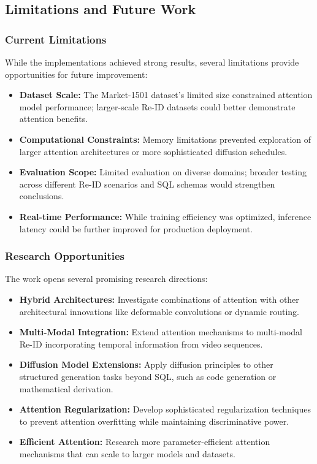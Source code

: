 \documentclass[a4paper,12pt]{article}
\begin{document}
\subsection{Limitations and Future Work}

\subsubsection*{Current Limitations}
While the implementations achieved strong results, several limitations provide opportunities for future improvement:

\begin{itemize}
    \item \textbf{Dataset Scale:} The Market-1501 dataset's limited size constrained attention model performance; larger-scale Re-ID datasets could better demonstrate attention benefits.
    \item \textbf{Computational Constraints:} Memory limitations prevented exploration of larger attention architectures or more sophisticated diffusion schedules.
    \item \textbf{Evaluation Scope:} Limited evaluation on diverse domains; broader testing across different Re-ID scenarios and SQL schemas would strengthen conclusions.
    \item \textbf{Real-time Performance:} While training efficiency was optimized, inference latency could be further improved for production deployment.
\end{itemize}

\subsubsection*{Research Opportunities}
The work opens several promising research directions:

\begin{itemize}
    \item \textbf{Hybrid Architectures:} Investigate combinations of attention with other architectural innovations like deformable convolutions or dynamic routing.
    \item \textbf{Multi-Modal Integration:} Extend attention mechanisms to multi-modal Re-ID incorporating temporal information from video sequences.
    \item \textbf{Diffusion Model Extensions:} Apply diffusion principles to other structured generation tasks beyond SQL, such as code generation or mathematical derivation.
    \item \textbf{Attention Regularization:} Develop sophisticated regularization techniques to prevent attention overfitting while maintaining discriminative power.
    \item \textbf{Efficient Attention:} Research more parameter-efficient attention mechanisms that can scale to larger models and datasets.
\end{itemize}
\end{document}
